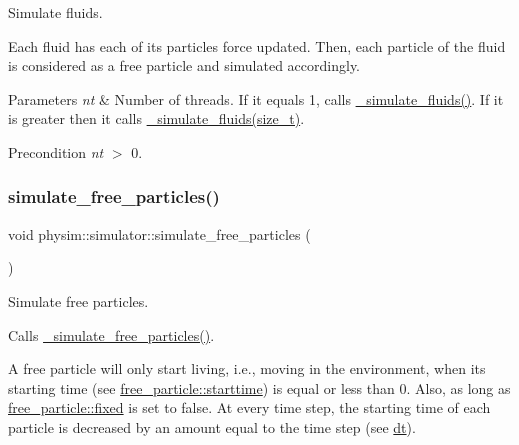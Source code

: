 Simulate fluids. 

Each fluid has each of its particle\textquotesingle{}s force updated. Then, each particle of the fluid is considered as a free particle and simulated accordingly.


\begin{DoxyParams}{Parameters}
{\em nt} & Number of threads. If it equals 1, calls \hyperlink{classphysim_1_1simulator_ac01677745377a9520453b73e199fcf99}{\+\_\+simulate\+\_\+fluids()}. If it is greater then it calls \hyperlink{classphysim_1_1simulator_a5b0b7e9c7790144f17d5de13c8d098dc}{\+\_\+simulate\+\_\+fluids(size\+\_\+t)}. \\
\hline
\end{DoxyParams}
\begin{DoxyPrecond}{Precondition}
{\itshape nt} $>$ 0. 
\end{DoxyPrecond}
\mbox{\label{classphysim_1_1simulator_ac836fc5c8ccf186b8030da54586a8b07}} 
\subsubsection{\texorpdfstring{simulate\+\_\+free\+\_\+particles()}{simulate\_free\_particles()}\hspace{0.1cm}{\footnotesize\ttfamily [1/2]}}
{\footnotesize\ttfamily void physim\+::simulator\+::simulate\+\_\+free\+\_\+particles (\begin{DoxyParamCaption}{ }\end{DoxyParamCaption})}



Simulate free particles. 

Calls \hyperlink{classphysim_1_1simulator_ae553797df3ee38cfe3c93bbc0b94be06}{\+\_\+simulate\+\_\+free\+\_\+particles()}.

A free particle will only start \textquotesingle{}living\textquotesingle{}, i.\+e., moving in the environment, when its starting time (see \hyperlink{classphysim_1_1particles_1_1free__particle_ad0379ba926ecc909bfbfb373045bfcf9}{free\+\_\+particle\+::starttime}) is equal or less than 0. Also, as long as \hyperlink{classphysim_1_1particles_1_1free__particle_a0f6d69caeac140abd74c7be4ed55eb74}{free\+\_\+particle\+::fixed} is set to false. At every time step, the starting time of each particle is decreased by an amount equal to the time step (see \hyperlink{classphysim_1_1simulator_a12a60d0ed819937b51ce50162dbdd6e1}{dt}).

